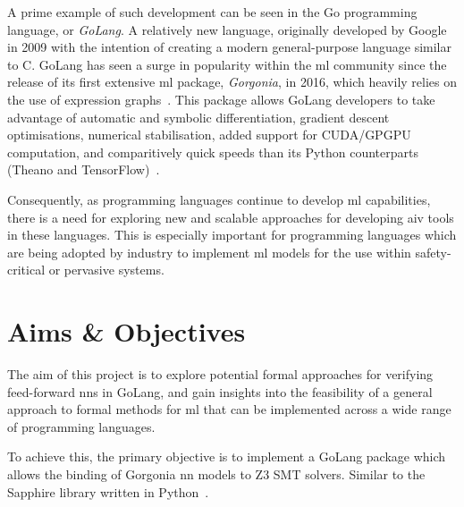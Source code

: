A prime example of such development can be seen in the Go programming language, or \textit{GoLang}. A relatively new language, originally developed by Google in 2009 with the intention
of creating a modern general-purpose language similar to C. 
GoLang has seen a surge in popularity within the \gls{ml} community since
the release of its first extensive \gls{ml} package, \textit{Gorgonia}, in 2016, which heavily relies on the use of expression graphs~\citep{chew2016}.
This package allows GoLang developers
to take advantage of automatic and symbolic differentiation, gradient descent optimisations, numerical stabilisation,
added support for CUDA/GPGPU computation, and comparitively quick speeds than its Python counterparts (Theano and TensorFlow)~\citep{golang2020}.


Consequently, as programming languages continue to develop \gls{ml} capabilities, there is a need for 
exploring new and scalable approaches for developing \gls{aiv} tools in these languages.
This is especially important for programming languages which are being adopted by industry to implement \gls{ml} models
for the use within safety-critical or pervasive systems.

\section{Aims \& Objectives}





The aim of this project is to explore potential formal approaches for verifying feed-forward \glspl{nn} in GoLang, and
gain insights into the feasibility of a general approach to formal methods for \gls{ml} that can be implemented across a wide range
of programming languages.

To achieve this, the primary objective is to implement a GoLang package which allows the binding of Gorgonia \gls{nn} models to 
Z3 SMT solvers. Similar to the Sapphire library written in Python~\citep{kokke2020}.
